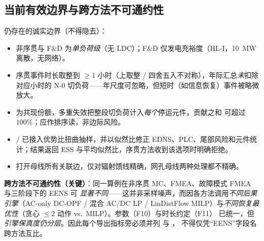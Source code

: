 \subsection{当前有效边界与跨方法不可通约性}\label{sec:rel-src-boundary}
仍存在的诚实边界（不得隐去）：
\begin{itemize}
 \item 非序贯与 F\&D 为\emph{单负荷级}（无 LDC）；F\&D 仅发电充裕度（HL-I，10~MW 离散，无网络）。
 \item 序贯事件时长取整到 $\ge1$ 小时（上取整 / 四舍五入不对称），年际汇总\emph{未}扣除对应小时的
 N-0 切负荷——年尺度可忽略，但短时（如信息恢复）事件被略微放大。
 \item {} 为共现份额，多重失效把整段切负荷计入\emph{每个}停运元件，贡献之和
 可超过 $100\%$；应作排序读，非边际风险。
 \item {}/ 已接入优势比扭曲抽样，并以似然比修正
 EDNS、PLC、尾部风险和元件统计；结果返回 ESS 与平均似然比，序贯方法收到该选项时明确拒绝。
 \item {} 打开母线所有关联边，仅对辐射馈线精确，网孔母线两种处理都不精确。
\end{itemize}
\textbf{跨方法不可通约性（关键）}：同一算例在非序贯 MC、FMEA、故障模式 FMEA 与三阶段下的 EENS 可
\emph{显著不同}——这并非采样噪声，而因各方法调用\emph{不同后果引擎}（AC-only DC-OPF / 混合 AC/DC LP /
LinDistFlow MILP）与\emph{不同恢复最优性}（贪心 $\le2$ 动作 vs.\ MILP）。参数（F10）与时长约定（F11）
已统一，但\emph{引擎保真度仍分层}。因此每个导出指标旁必须并列  与 ，
不得仅凭“EENS”字段名跨方法互比。
